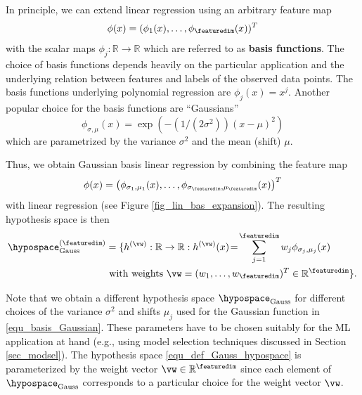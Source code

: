 \documentclass[12pt]{report}
\begin{document}
In principle, we can extend linear regression using an arbitrary feature map 
\begin{equation} 
\phi(x) = (\phi_{1}(x),\ldots,\phi_{\featuredim}(x))^{T}  
\end{equation} 
with the scalar maps $\phi_{j}: \mathbb{R} \rightarrow \mathbb{R}$ which are referred to as {\bf basis functions}. 
The choice of basis functions depends heavily on the particular application and the underlying relation between 
features and labels of the observed data points. The basis functions underlying polynomial regression are 
$\phi_{j}(x)= x^{j}$. Another popular choice for the basis functions are ``Gaussians'' 
\begin{equation} 
\label{equ_basis_Gaussian}
\phi_{\sigma,\mu}(x) = \exp(-(1/(2\sigma^{2})) (x\!-\!\mu)^{2}) 
\end{equation}
which are parametrized by the variance $\sigma^{2}$ and the mean (shift) $\mu$. 

Thus, we obtain Gaussian basis linear regression by combining the feature map 
\begin{equation} 
\phi(x) = \big (\phi_{\sigma_{1},\mu_{1}}(x) ,\ldots,\phi_{\sigma_{\featuredim},\mu_{\featuredim}}(x) \big)^{T} 
\end{equation}
with linear regression (see Figure \ref{fig_lin_bas_expansion}). The resulting hypothesis space is then
\begin{align}
\label{equ_def_Gauss_hypospace}
\hypospace^{(\featuredim)}_{\rm Gauss} & = \{ h^{(\vw)}: \mathbb{R} \rightarrow \mathbb{R}: h^{(\vw)}(x)\!=\!\sum_{j=1}^{\featuredim}  w_{j}\phi_{\sigma_{j},\mu_{j}}(x) \nonumber \\
& \mbox{ with weights } \vw=(w_{1},\ldots,w_{\featuredim})^{T} \in \mathbb{R}^{\featuredim}\}.
\end{align}

Note that we obtain a different hypothesis space $\hypospace_{\rm Gauss}$ for different choices of the 
variance $\sigma^{2}$ and shifts $\mu_{j}$ used for the Gaussian function in \eqref{equ_basis_Gaussian}. 
These parameters have to be chosen suitably for the ML application at hand (e.g., using model selection 
techniques discussed in Section \ref{sec_modsel}). The hypothesis space \eqref{equ_def_Gauss_hypospace} 
is parameterized by the weight vector $\vw \in \mathbb{R}^{\featuredim}$ since each element 
of $\hypospace_{\rm Gauss}$ corresponds to a particular choice for the weight vector $\vw$. 

\end{document}
